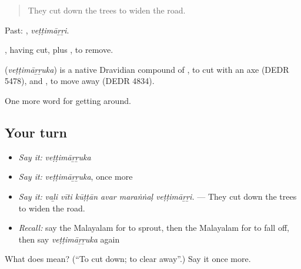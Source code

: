 \begin{quote}
They cut down the trees to widen the road.
\end{quote}

Past: , \emph{veṭṭimāṟṟi}.

, having cut, plus , to remove.

\begin{cousinweb}
\textbf{} (\emph{veṭṭimāṟṟuka}) is a native Dravidian compound of , to cut with an axe (DEDR 5478), and , to move away (DEDR 4834).
\end{cousinweb}

\begin{grammarlens}[title={What you've built}]
One more word for getting around.
\end{grammarlens}

\subsection*{Your turn}
\begin{itemize}
\raggedright
  \item \emph{Say it:} \emph{veṭṭimāṟṟuka}
  \item \emph{Say it:} \emph{veṭṭimāṟṟuka}, once more
  \item \emph{Say it:} \emph{vaḻi vīti kūṭṭān avar maraṅṅaḷ veṭṭimāṟṟi.} — They cut down the trees to widen the road.
  \item \emph{Recall:} say the Malayalam for to sprout, then the Malayalam for to fall off, then say \emph{veṭṭimāṟṟuka} again
\end{itemize}

\begin{tcolorbox}[breakable,colback=teal!4,colframe=teal!35!black,title={Before you move on}]
What does  mean? (\textquotedblleft{}To cut down; to clear away\textquotedblright{}.) Say it once more.
\end{tcolorbox}

